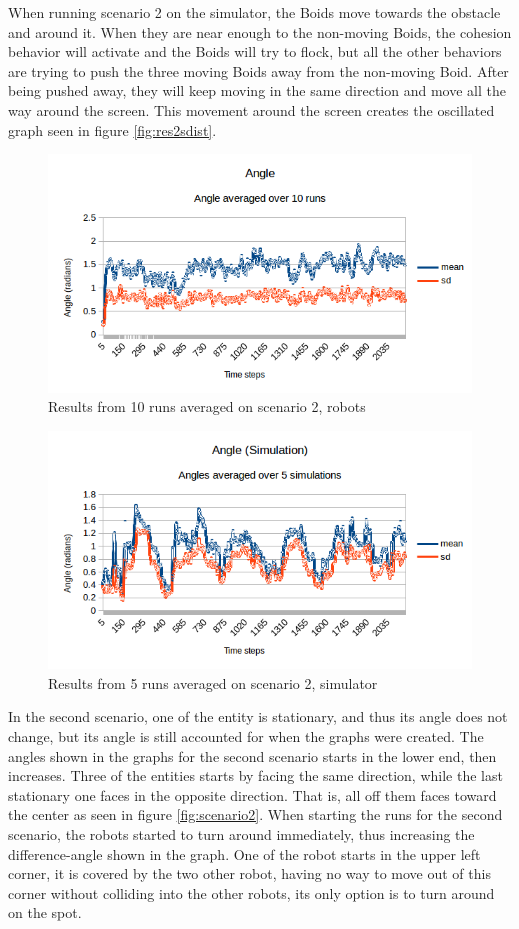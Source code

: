 When running scenario 2 on the simulator, the Boids move towards the obstacle and around it. When they are near enough to the non-moving Boids, the cohesion behavior will activate and the Boids will try to flock, but all the other behaviors are trying to push the three moving Boids away from the non-moving Boid. After being pushed away, they will keep moving in the same direction and move all the way around the screen. This movement around the screen creates the oscillated graph seen in figure \ref{fig:res2sdist}.

\begin{figure}[h]
\begin{center}
\includegraphics[width=0.8\linewidth]{figs/runs/2pangle}
\end{center}
\caption[2. Angle, robots]{Results from 10 runs averaged on scenario 2, robots}
\label{fig:res2pang}
\end{figure}
\begin{figure}[h]
\begin{center}
\includegraphics[width=0.8\linewidth]{figs/runs/2sangle}
\end{center}
\caption[2. Angles, robots]{Results from 5 runs averaged on scenario 2, simulator}
\label{fig:res2sang}
\end{figure}
In the second scenario, one of the entity is stationary, and thus its angle does not change, but its angle is still accounted for when the graphs were created. The angles shown in the graphs for the second scenario starts in the lower end, then increases.
Three of the entities starts by facing the same direction, while the last stationary one faces in the opposite direction. That is, all off them faces toward the center as seen in figure \ref{fig:scenario2}.
When starting the runs for the second scenario, the robots started to turn around immediately, thus increasing the difference-angle shown in the graph. One of the robot starts in the upper left corner, it is covered by the two other robot, having no way to move out of this corner without colliding into the other robots, its only option is to turn around on the spot.

